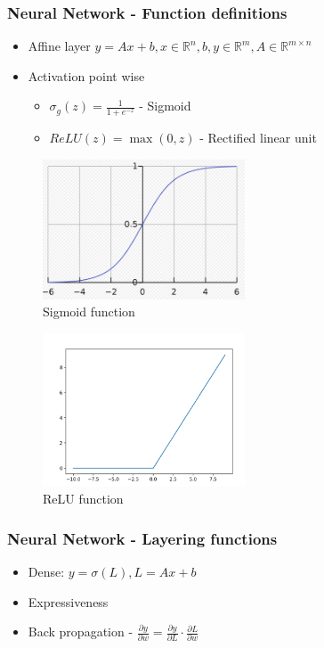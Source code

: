 \documentclass[12pt]{report}
\begin{document}
\subsubsection{Neural Network - Function definitions}
\begin{itemize}
	\item Affine layer $y = Ax + b , x \in \mathbb{R}^n, b, y \in \mathbb{R}^m, A \in \mathbb{R}^{m \times n}$
	\item Activation point wise
	\begin{itemize}
		\item $\sigma_g(z) = \frac{1}{1+e^{-z}}$ - Sigmoid 
		\item $ReLU(z) = \max(0, z)$  - Rectified linear unit
	\end{itemize}	
\end{itemize}

\begin{figure}[H]\centering\includegraphics[width=6cm]{sigmoid.png}\caption{Sigmoid function}\end{figure}
\begin{figure}[H]\centering\includegraphics[width=6cm]{RELU.png}\caption{ReLU function}\end{figure}

\newpage
\subsubsection{Neural Network - Layering functions}

\begin{itemize}
	\item Dense: $y = \sigma(L), L = Ax+b$
	\item Expressiveness 
	\item Back propagation - $\frac{\partial y}{ \partial w} =  \frac{\partial y}{ \partial L} \cdot \frac{\partial L}{ \partial w}$
\end{itemize}
\end{document}

